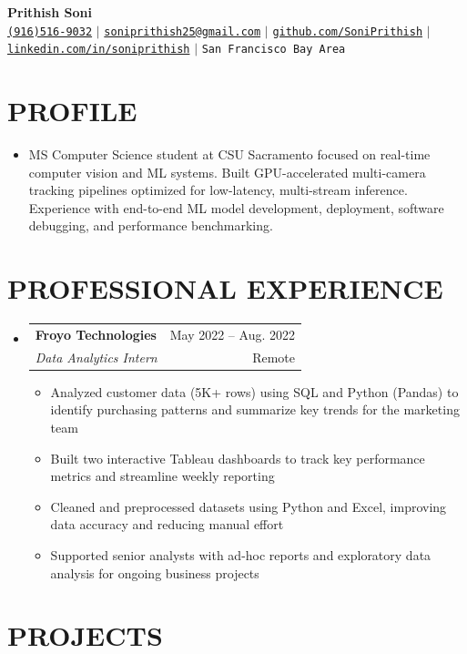 \documentclass[letterpaper,10pt]{article}
\makeatletter
\newcommand{\resumeItem}[1]{
  \item\small{{#1 \vspace{-1pt}}}
}
\newcommand{\resumeSubheading}[4]{
  \vspace{-2pt}\item
  \begin{tabular*}{\textwidth}[t]{l@{\extracolsep{\fill}}r}
    \textbf{#1} & {\color{dark-grey}\small #2}\vspace{1pt}\\
    \textit{#3} & {\color{dark-grey} \small #4}\\
  \end{tabular*}\vspace{-6pt}
}
\newcommand{\resumeSubHeadingListStart}{\begin{itemize}[leftmargin=0in,label={},itemsep=2pt,topsep=3pt,parsep=0pt,partopsep=0pt]}
\newcommand{\resumeSubHeadingListEnd}{\end{itemize}}
\newcommand{\resumeItemListStart}{\begin{itemize}[leftmargin=0.2in,itemsep=2pt,topsep=2pt,parsep=0pt,partopsep=0pt]}
\newcommand{\resumeItemListEnd}{\end{itemize}\vspace{0pt}}
\makeatother
\begin{document}
\begin{center}
\textbf{\Huge Prithish Soni} \\ \vspace{2pt}
\small
\faPhone* \href{tel:+19165169032}{\texttt{(916)516-9032}} $|$
\faEnvelope \href{mailto:soniprithish25@gmail.com}{\texttt{soniprithish25@gmail.com}} $|$
\faGithub \href{https://github.com/SoniPrithish}{\texttt{github.com/SoniPrithish}} $|$
\faLinkedin \href{https://www.linkedin.com/in/soniprithish}{\texttt{linkedin.com/in/soniprithish}} $|$
\faMapMarker* \texttt{San Francisco Bay Area}
\\ \vspace{-6pt}
\end{center}

\section{PROFILE}
\resumeSubHeadingListStart
\item\small{MS Computer Science student at CSU Sacramento focused on real-time computer vision and ML systems. Built GPU-accelerated multi-camera tracking pipelines optimized for low-latency, multi-stream inference. Experience with end-to-end ML model development, deployment, software debugging, and performance benchmarking.}
\resumeSubHeadingListEnd

\section{PROFESSIONAL EXPERIENCE}
\resumeSubHeadingListStart

\resumeSubheading
{Froyo Technologies}{May 2022 -- Aug. 2022}
{Data Analytics Intern}{Remote}

\resumeItemListStart
\resumeItem{Analyzed customer data (5K+ rows) using SQL and Python (Pandas) to identify purchasing patterns and summarize key trends for the marketing team}
\resumeItem{Built two interactive Tableau dashboards to track key performance metrics and streamline weekly reporting}
\resumeItem{Cleaned and preprocessed datasets using Python and Excel, improving data accuracy and reducing manual effort}
\resumeItem{Supported senior analysts with ad-hoc reports and exploratory data analysis for ongoing business projects}
\resumeItemListEnd

\resumeSubHeadingListEnd

\section{PROJECTS}
\end{document}
